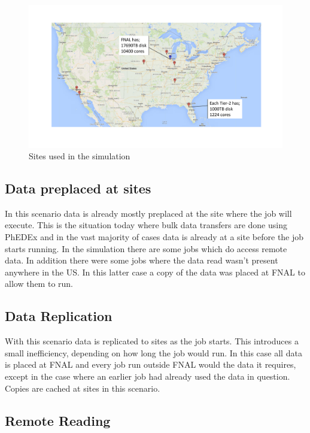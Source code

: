 \documentclass[a4paper]{jpconf}
\begin{document}
\begin{figure}
  \includegraphics[trim=80 90 80 90, clip, width=\textwidth]{figures/map.pdf}
  \caption{Sites used in the simulation\label{fig:map}}
\end{figure}

\subsection{Data preplaced at sites\label{sec:today}}

In this scenario data is already mostly preplaced at the site where
the job will execute. This is the situation today where bulk data
transfers are done using PhEDEx and in the vast majority of cases data
is already at a site before the job starts running. In the simulation
there are some jobs which do access remote data. In addition there
were some jobs where the data read wasn't present anywhere in the
US. In this latter case a copy of the data was placed at FNAL to allow
them to run.

\subsection{Data Replication}

With this scenario data is replicated to sites as the job starts. This
introduces a small inefficiency, depending on how long the job would
run. In this case all data is placed at FNAL and every job run outside
FNAL would the data it requires, except in the case where an earlier
job had already used the data in question. Copies are cached at sites
in this scenario.

\subsection{Remote Reading}
\end{document}
